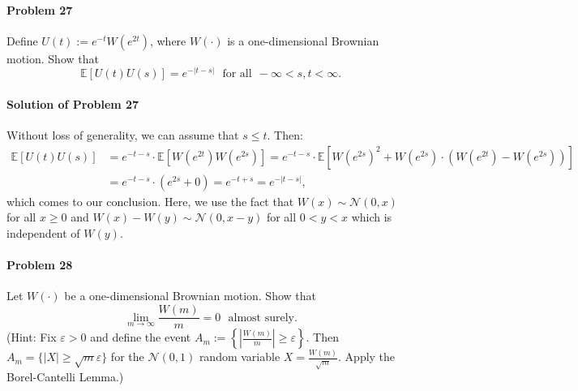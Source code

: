 \documentclass{article}
\begin{document}
\paragraph{Problem 27} Define $U(t) := e^{-t} W(e^{2t})$, where $W(\cdot)$ is a one-dimensional Brownian motion. Show that 
\[\mathbb{E}[U(t)U(s)]=e^{-|t-s|}~~~\text{for all}~~-\infty<s,t<\infty.\]

\paragraph{Solution of Problem 27} Without loss of generality, we can assume that $s\leqslant t$. Then:
\begin{equation*}
\begin{aligned}
\mathbb{E}[U(t)U(s)] &= e^{-t-s}\cdot\mathbb{E}[W(e^{2t})W(e^{2s})] = e^{-t-s}\cdot\mathbb{E}\left[W(e^{2s})^2 + W(e^{2s})\cdot(W(e^{2t})-W(e^{2s}))\right]\\
&= e^{-t-s}\cdot(e^{2s} + 0)  = e^{-t+s} = e^{-|t-s|},
\end{aligned}    
\end{equation*}
which comes to our conclusion. Here, we use the fact that $W(x)\sim\mathcal N(0,x)$ for all $x\geqslant 0$ and $W(x)-W(y)\sim \mathcal N(0,x-y)$ for all $0<y<x$ which is independent of $W(y)$. 

\paragraph{Problem 28} Let $W(\cdot)$ be a one-dimensional Brownian motion. Show that 
\[\lim_{m\rightarrow\infty}\frac{W(m)}{m}=0~~~\text{almost surely.}\]
(Hint: Fix $\varepsilon > 0$ and define the event $A_m:=\left\{\left|\frac{W(m)}{m}\right|\geqslant \varepsilon\right\}$. Then $A_m=\{|X|\geqslant \sqrt{m}\varepsilon\}$ for the $\mathcal N(0,1)$ random variable $X=\frac{W(m)}{\sqrt{m}}$. Apply the Borel-Cantelli Lemma.)
\end{document}
